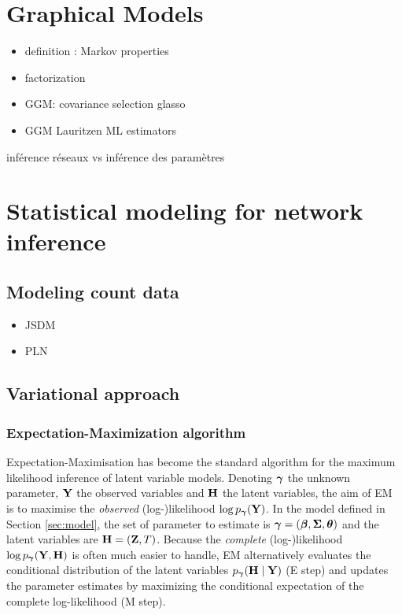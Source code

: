 \section{Graphical Models}
 \begin{itemize}
 \item definition : Markov properties
 \item factorization
 \item GGM: covariance selection glasso
 \item GGM Lauritzen  ML estimators
 \end{itemize}
 inférence réseaux vs inférence des paramètres
  
\section{Statistical modeling for network inference}
 \subsection{Modeling count data}
\begin{itemize}
 \item JSDM
 \item PLN
 \end{itemize}
 
 \subsection{Variational approach}
 \subsubsection{Expectation-Maximization algorithm}
 Expectation-Maximisation \citep[EM:][]{DLR77} has become the standard algorithm for the maximum likelihood inference of latent variable models. Denoting ${\boldsymbol{\gamma}}$ the unknown parameter, ${\bf Y}$ the observed variables and ${\bf H}$ the latent variables, the aim of EM is to maximise the {\sl observed} (log-)likelihood $\log p_{\boldsymbol{\gamma}}({\bf Y})$. 
In the model defined in Section \ref{sec:model}, the set of parameter to estimate is ${\boldsymbol{\gamma}} = ({\boldsymbol{\beta}}, {\boldsymbol{\Sigma}}, {\boldsymbol{\theta}})$ and the latent variables are ${\bf H} = ({\bf Z}, T)$.
Because the {\sl complete} (log-)likelihood $\log p_{\boldsymbol{\gamma}}({\bf Y}, {\bf H})$ is often much easier to handle, EM alternatively evaluates the conditional distribution of the latent variables $p_{\boldsymbol{\gamma}}({\bf H} \mid {\bf Y})$ (E step) and updates the parameter estimates by maximizing the conditional expectation of the complete log-likelihood (M step).
